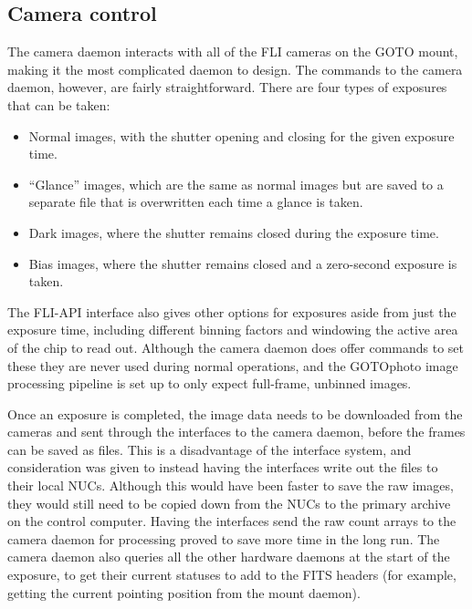 \subsection{Camera control}
\label{sec:cam}
\begin{colsection}

The camera daemon interacts with all of the FLI cameras on the GOTO mount, making it the most complicated daemon to design. The commands to the camera daemon, however, are fairly straightforward. There are four types of exposures that can be taken:

\begin{itemize}
    \item Normal images, with the shutter opening and closing for the given exposure time.
    \item ``Glance'' images, which are the same as normal images but are saved to a separate file that is overwritten each time a glance is taken.
    \item Dark images, where the shutter remains closed during the exposure time.
    \item Bias images, where the shutter remains closed and a zero-second exposure is taken.
\end{itemize}

The FLI-API interface also gives other options for exposures aside from just the exposure time, including different binning factors and windowing the active area of the chip to read out. Although the camera daemon does offer commands to set these they are never used during normal operations, and the GOTOphoto image processing pipeline is set up to only expect full-frame, unbinned images.

Once an exposure is completed, the image data needs to be downloaded from the cameras and sent through the interfaces to the camera daemon, before the frames can be saved as  files. This is a disadvantage of the interface system, and consideration was given to instead having the interfaces write out the files to their local NUCs. Although this would have been faster to save the raw images, they would still need to be copied down from the NUCs to the primary archive on the control computer. Having the interfaces send the raw count arrays to the camera daemon for processing proved to save more time in the long run. The camera daemon also queries all the other hardware daemons at the start of the exposure, to get their current statuses to add to the FITS headers (for example, getting the current pointing position from the mount daemon).


\end{colsection}
